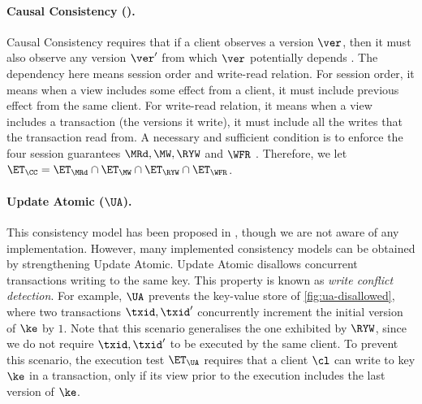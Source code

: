 \paragraph{Causal Consistency (\CC).}
Causal Consistency requires that if a client observes a version $\ver$, 
then it must also observe any version $\ver'$ from which $\ver$ potentially depends \cite{cops}. 
The dependency here means session order and write-read relation.
For session order, it means when a view includes some effect from a client, 
it must include previous effect from the same client.
For write-read relation, it means when a view includes a transaction (the versions it write),
it must include all the writes that the transaction read from.
A necessary and sufficient condition is to enforce the four session guarantees $\MRd, \MW, \RYW$ and $\WFR$ \cite{session2causal}.
Therefore, we let $\ET_{\CC} = \ET_{\MRd} \cap \ET_{\MW} \cap \ET_{\RYW} \cap \ET_{\WFR}$. 

\paragraph{Update Atomic ($\UA$).}
This consistency model has been proposed in \cite{framework-concur}, 
though we are not aware of any implementation. 
However, many implemented consistency models can be obtained by strengthening Update Atomic.
Update Atomic disallows concurrent transactions writing to the same key. 
This property is known as \emph{write conflict detection}.
For example, $\UA$ prevents the key-value store of \cref{fig:ua-disallowed},
where two transactions $\txid, \txid'$ concurrently increment the initial version of $\ke$ by $1$.
Note that this scenario generalises the one exhibited by $\RYW$, 
since we do not require $\txid, \txid'$ to be executed by the same client.
To prevent this scenario, the execution test $\ET_\UA$ requires that 
a client $\cl$ can write to key $\ke$ in a transaction,
only if its view prior to the execution includes the last version of $\ke$.

